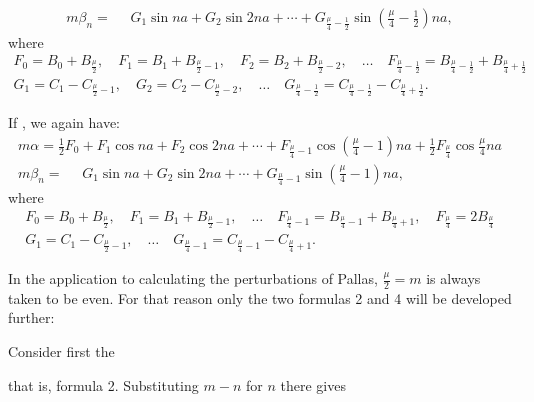 \begin{landscape}
\[\begin{array}{l}
m\beta_n = \phantom{{}={}} G_1\sin na + G_2\sin 2na + \cdots + G_{\frac{\mu}{4}-\frac{1}{2}}\sin\left(\frac{\mu}{4}-\frac{1}{2}\right)na,
\end{array}
\]
where
\[
\begin{gathered}
F_0 = B_0 + B_{\frac{\mu}{2}}, \quad F_1 = B_1 + B_{\frac{\mu}{2}-1}, \quad F_2 = B_2 + B_{\frac{\mu}{2}-2}, \quad \ldots \quad F_{\frac{\mu}{4}-\frac{1}{2}} = B_{\frac{\mu}{4}-\frac{1}{2}} + B_{\frac{\mu}{4}+\frac{1}{2}}\\[4pt]
G_1 = C_1 - C_{\frac{\mu}{2}-1}, \quad G_2 = C_2 - C_{\frac{\mu}{2}-2}, \quad \ldots \quad G_{\frac{\mu}{4}-\frac{1}{2}} = C_{\frac{\mu}{4}-\frac{1}{2}} - C_{\frac{\mu}{4}+\frac{1}{2}}.
\end{gathered}
\]
\par\noindent\hspace*{\parindent}If , we again have:
\[
\tag*{4)}
\begin{array}{l}
m\alpha = \tfrac{1}{2}F_0 + F_1\cos na + F_2\cos 2na + \cdots + F_{\frac{\mu}{4}-1}\cos\left(\frac{\mu}{4}-1\right)na + \tfrac{1}{2}F_{\frac{\mu}{4}}\cos\frac{\mu}{4}na \\[4pt]
m\beta_n = \phantom{{}={}} G_1\sin na + G_2\sin 2na + \cdots + G_{\frac{\mu}{4}-1}\sin\left(\frac{\mu}{4}-1\right)na,
\end{array}
\]
where
\[
\begin{gathered}
F_0 = B_0 + B_{\frac{\mu}{2}}, \quad F_1 = B_1 + B_{\frac{\mu}{2}-1}, \quad \ldots \quad F_{\frac{\mu}{4}-1} = B_{\frac{\mu}{4}-1} + B_{\frac{\mu}{4}+1}, \quad F_{\frac{\mu}{4}} = 2B_{\frac{\mu}{4}}\\[4pt]
G_1 = C_1 - C_{\frac{\mu}{2}-1}, \quad \ldots \quad G_{\frac{\mu}{4}-1} = C_{\frac{\mu}{4}-1} - C_{\frac{\mu}{4}+1}.
\end{gathered}
\]
\par\noindent\hspace*{\parindent}In the application to calculating the perturbations of Pallas, \(\frac{\mu}{2}=m\) is always taken to be even. For that reason only the two formulas 2 and 4 will be developed further:
\par\noindent\hspace*{\parindent}Consider first the
\par\nobreak\smallskip\noindent\hfill{}\hfill\mbox{}\par\nobreak\smallskip\noindent
that is, formula 2. Substituting \(m-n\) for \(n\) there gives

\end{landscape}
